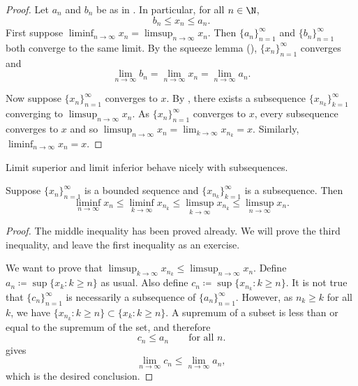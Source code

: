 \begin{proof}
Let $a_n$ and $b_n$ be as in .
In particular, for all $n \in \N$,
\begin{equation*}
b_n \leq x_n \leq a_n .
\end{equation*}
First suppose
$\liminf_{n\to\infty} x_n = \limsup_{n\to\infty} x_n$.
Then $\{ a_n \}_{n=1}^\infty$ and $\{ b_n \}_{n=1}^\infty$
both converge to the same limit.
By the squeeze lemma
(), $\{ x_n \}_{n=1}^\infty$ converges and
\begin{equation*}
\lim_{n\to \infty} b_n
=
\lim_{n\to \infty} x_n
=
\lim_{n\to \infty} a_n .
\end{equation*}

Now suppose $\{ x_n \}_{n=1}^\infty$ converges to $x$.
By ,
there exists a subsequence $\{ x_{n_k} \}_{k=1}^\infty$
converging to $\limsup_{n\to\infty} x_n$.
As $\{ x_n \}_{n=1}^\infty$ converges to $x$,
every subsequence converges to $x$ and
so $\limsup_{n\to\infty} x_n = \lim_{k\to\infty} x_{n_k} = x$.
Similarly, $\liminf_{n\to\infty} x_n = x$.
\end{proof}

Limit superior and limit inferior behave nicely
with subsequences.

\begin{prop} \label{prop:subseqslimsupinf}
Suppose $\{ x_n \}_{n=1}^\infty$ is a bounded sequence and
$\{ x_{n_k} \}_{k=1}^\infty$ is a subsequence.  Then
\begin{equation*}
\liminf_{n\to\infty} x_n \leq
\liminf_{k\to\infty} x_{n_k} \leq
\limsup_{k\to\infty} x_{n_k} \leq
\limsup_{n\to\infty} x_n .
\end{equation*}
\end{prop}

\begin{proof}
The middle inequality has been proved already.  We will prove the third
inequality, and leave the first inequality as an exercise.

We want to prove that
$\limsup_{k\to\infty} x_{n_k} \leq \limsup_{n\to\infty} x_n$.  Define
$a_n \coloneqq \sup \{ x_k : k \geq n \}$ 
as usual.
Also define
$c_n \coloneqq \sup \{ x_{n_k} : k \geq n \}$.
It is not true that $\{ c_n \}_{n=1}^\infty$ is necessarily a subsequence
of $\{ a_n \}_{n=1}^\infty$.
However, as $n_k \geq k$ for all $k$, we have
$\{ x_{n_k} : k \geq n \} \subset \{ x_k : k \geq n \}$.
A supremum of a subset is less than or equal to the supremum of the
set, and therefore
\begin{equation*}
c_n \leq a_n \qquad \text{for all $n$}.
\end{equation*}
 gives
\begin{equation*}
\lim_{n\to\infty} c_n \leq \lim_{n\to\infty} a_n ,
\end{equation*}
which is the desired conclusion.
\end{proof}

